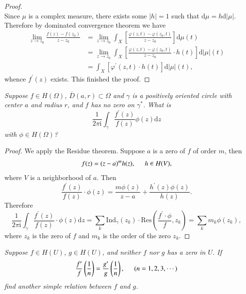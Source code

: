 \begin{proof}
$$$$
Since $\mu$ is a complex measure, there exists some $|h|=1$ such that $\mathrm{d}\mu=h\mathrm{d}|\mu|$. Therefore by dominated convergence theorem we have 
$$
\begin{aligned}
\lim_{z\rightarrow z_0} \frac{f\left( z \right) -f\left( z_0 \right)}{z-z_0}&=\lim_{z\rightarrow z_0} \int_X{\left[ \frac{\varphi \left( z,t \right) -\varphi \left( z_0,t \right)}{z-z_0} \right] \mathrm{d}\mu \left( t \right)}
\\
&=\lim_{z\rightarrow z_0} \int_X{\left[ \frac{\varphi \left( z,t \right) -\varphi \left( z_0,t \right)}{z-z_0}\cdot h\left( t \right) \right] \mathrm{d}\left| \mu \right|\left( t \right)}
\\
&=\int_X{\left[ \varphi ^{\prime}\left( z,t \right) \cdot h\left( t \right) \right] \mathrm{d}\left| \mu \right|\left( t \right)},
\end{aligned}
$$
whence $f^\prime(z)$ exists. This finished the proof.
\end{proof}
\begin{problem}\em
Suppose $f\in H(\Omega)$, $\overline{D}(a,r)\subset\Omega$ and $\gamma$ is a positively oriented circle with center $a$ and radius $r$, and $f$ has no zero on $\gamma^*$. What is 
$$\frac{1}{2\pi\mathrm{i}}\int_\gamma\frac{f^\prime(z)}{f(z)}\phi(z)\mathrm{d}z$$
with $\phi\in H(\Omega)$?
\end{problem}
\begin{proof}
We apply the Residue theorem. Suppose $a$ is a zero of $f$ of order $m$, then 
$$f(z)=(z-a)^mh(z),\hspace{0.5cm}h\in H(V),$$
where $V$ is a neighborhood of $a$. Then 
$$
\frac{f^{\prime}\left( z \right)}{f\left( z \right)}\cdot \phi \left( z \right) =\frac{m\phi \left( z \right)}{z-a}+\frac{h^{\prime}\left( z \right) \phi \left( z \right)}{h\left( z \right)}.
$$
Therefore 
$$
\frac{1}{2\pi \mathrm{i}}\int_{\gamma}{\frac{f^{\prime}\left( z \right)}{f\left( z \right)}\cdot \phi \left( z \right) \mathrm{d}z}=\sum_k{\mathrm{Ind}_{\gamma}\left( z_k \right) \cdot \mathrm{Res}\left( \frac{f^{\prime}\cdot \phi}{f},z_k \right)}=\sum_k{m_k\phi \left( z_k \right)},
$$
where $z_k$ is the zero of $f$ and $m_k$ is the order of the zero $z_k$.
\end{proof}
\begin{problem}\em
Suppose $f\in H(U)$, $g\in H(U)$, and neither $f$ nor $g$ has a zero in $U$. If 
$$\frac{f^\prime}{f}\left(\frac{1}{n}\right)=\frac{g^\prime}{g}\left(\frac{1}{n}\right),\hspace{0.5cm}(n=1,2,3,\cdots)$$
find another simple relation between $f$ and $g$.
\end{problem}
